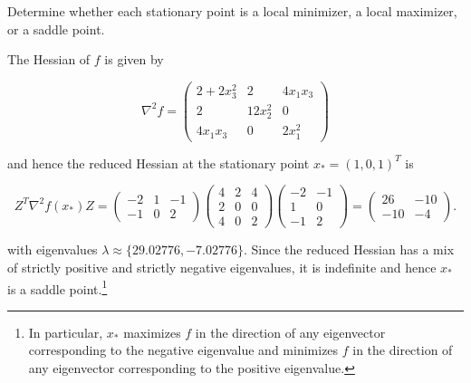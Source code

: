 Determine whether each stationary point is a local minimizer, a local maximizer, or a saddle point.

\begin{solution}
    The Hessian of $f$ is given by 

    $$
    \nabla^2 f = \begin{pmatrix*}
        2 + 2 x_3^2 & 2        & 4 x_1 x_3 \\
        2           & 12 x_2^2 & 0 \\
        4 x_1 x_3   & 0        & 2 x_1^2
    \end{pmatrix*}
    $$

    and hence the reduced Hessian at the stationary point $x_* = (1, 0, 1)^T$ is

    $$
    Z^T \nabla^2 f(x_*) Z = \begin{pmatrix*}
        -2 & 1 & -1 \\
        -1 & 0 &  2
    \end{pmatrix*} \begin{pmatrix*}
        4 & 2 & 4 \\
        2 & 0 & 0 \\
        4 & 0 & 2
    \end{pmatrix*} \begin{pmatrix*}
        -2 & -1 \\
         1 & 0  \\
        -1 & 2
    \end{pmatrix*} = \begin{pmatrix*}
        26 & -10 \\
       -10 & -4
    \end{pmatrix*}.
    $$

    with eigenvalues $\lambda \approx \{29.02776, -7.02776\}$. Since the reduced Hessian has a mix of strictly positive 
    and strictly negative eigenvalues, it is indefinite and hence $x_*$ is a saddle point.\footnote{
        In particular, $x_*$ maximizes $f$ in the direction of any eigenvector corresponding to the negative eigenvalue
        and minimizes $f$ in the direction of any eigenvector corresponding to the positive eigenvalue.
    }
    \ \\
\end{solution}
